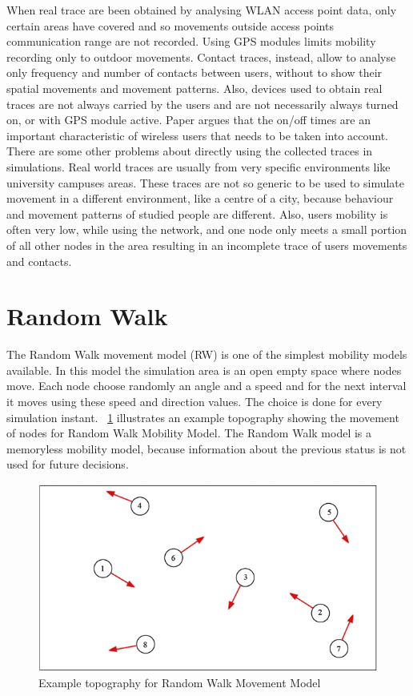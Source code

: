 When real trace are been obtained by analysing WLAN access point data, only certain areas have covered and so movements outside access points communication range are not recorded. Using GPS modules limits mobility recording only to outdoor movements. Contact traces, instead, allow to analyse only frequency and number of contacts between users, without to show their spatial movements and movement patterns. Also, devices used to obtain real traces are not always carried by the users and are not necessarily always turned on, or with GPS module active. Paper \cite{ImpactofHumanMobility} argues that the on/off times are an important characteristic of wireless users that needs to be taken into account.
\\

There are some other problems about directly using the collected traces in simulations. Real world traces are usually from very specific environments like university campuses areas. These traces are not so generic to be used to simulate movement in a different environment, like a centre of a city, because behaviour and movement patterns of studied people are different. Also, users mobility is often very low, while using the network, and one node only meets a small portion of all other nodes in the area resulting in an incomplete trace of users movements and contacts.
\\


\section{Random Walk}
The Random Walk movement model (RW) is one of the simplest mobility models available. In this model the simulation area is an open empty space where nodes move. Each node choose randomly an angle and a speed and for the next interval it moves using these speed and direction values. The choice is done for every simulation instant. \figurename~\ref{fig:random_walk} illustrates an example topography showing the movement of nodes for Random Walk Mobility Model. The Random Walk model is a memoryless mobility model, because information about the previous status is not used for future decisions. 
\begin{figure}[htpb]
  \begin{center}
    \includegraphics[scale=0.6]{4-movimento/img/random_walk.png}
    \caption{Example topography for Random Walk Movement Model}    
    \label{fig:random_walk}
  \end{center}
\end{figure}


